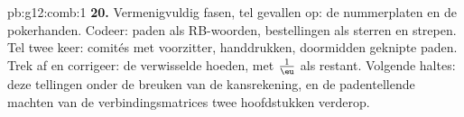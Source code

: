 \begin{solution}{pb:g12:comb:1}
\textbf{20.} Vermenigvuldig fasen, tel gevallen op: de nummerplaten en de
pokerhanden. Codeer: paden als RB-woorden, bestellingen als sterren en
strepen. Tel twee keer: comités met voorzitter, handdrukken, doormidden
geknipte paden. Trek af en corrigeer: de verwisselde hoeden, met $\frac1\eu$
als restant. Volgende haltes: deze tellingen onder de breuken van de
kansrekening, en de padentellende machten van de verbindingsmatrices twee
hoofdstukken verderop.
\end{solution}
